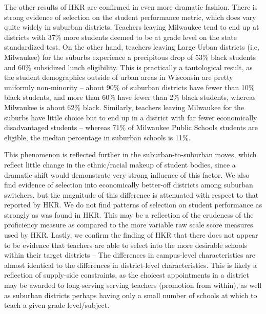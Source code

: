 \documentclass[12pt,]{article}
\begin{document}
The other results of HKR are confirmed in even more dramatic fashion.
There is strong evidence of selection on the student performance metric,
which does vary quite widely in suburban districts. Teachers leaving
Milwaukee tend to end up at districts with 37\% more students deemed to
be at grade level on the state standardized test. On the other hand,
teachers leaving Large Urban districts (i.e, Milwaukee) for the suburbs
experience a precipitous drop of 53\% black students and 60\% subsidized
lunch eligibility. This is practically a tautological result, as the
student demographics outside of urban areas in Wisconsin are pretty
uniformly non-minority -- about 90\% of suburban districts have fewer
than 10\% black students, and more than 60\% have fewer than 2\% black
students, whereas Milwaukee is about 62\% black. Similarly, teachers
leaving Milwaukee for the suburbs have little choice but to end up in a
district with far fewer economically disadvantaged students -- whereas
71\% of Milwaukee Public Schools students are eligible, the median
percentage in suburban schools is 11\%.

This phenomenon is reflected further in the suburban-to-suburban moves,
which reflect little change in the ethnic/racial makeup of student
bodies, since a dramatic shift would demonstrate very strong influence
of this factor. We also find evidence of selection into economically
better-off districts among suburban switchers, but the magnitude of this
difference is attenuated with respect to that reported by HKR. We do not
find patterns of selection on student performance as strongly as was
found in HKR. This may be a reflection of the crudeness of the
proficiency measure as compared to the more variable raw scale score
measures used by HKR. Lastly, we confirm the finding of HKR that there
does not appear to be evidence that teachers are able to select into the
more desirable schools within their target districts -- The differences
in campus-level characteristics are almost identical to the differences
in district-level characteristics. This is likely a reflection of
supply-side constraints, as the choicest appointments in a district may
be awarded to long-serving serving teachers (promotion from within), as
well as suburban districts perhaps having only a small number of schools
at which to teach a given grade level/subject.
\end{document}
